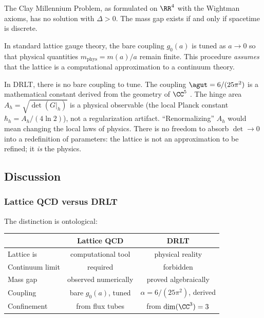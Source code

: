 \begin{corollary}
The Clay Millennium Problem, as formulated on $\RR^4$ with the
Wightman axioms, has no solution with $\Delta > 0$. The mass gap exists
if and only if spacetime is discrete.
\end{corollary}

\begin{remark}
In standard lattice gauge theory, the bare coupling $g_0(a)$ is tuned as
$a \to 0$ so that physical quantities $m_{\mathrm{phys}} = m(a)/a$
remain finite. This procedure \emph{assumes} that the lattice is a
computational approximation to a continuum theory.

In DRLT, there is no bare coupling to tune. The coupling
$\agut = 6/(25\pi^2)$ is a mathematical constant
derived from the geometry of $\CC^5$ . The hinge
area $A_h = \sqrt{\det(G|_h)}$ is a physical observable (the local
Planck constant $\hbar_h = A_h/(4\ln 2)$), not a regularization
artifact. ``Renormalizing'' $A_h$ would mean changing the local laws of
physics. There is no freedom to absorb $\det \to 0$ into a redefinition
of parameters: the lattice is not an approximation to be refined; it
\emph{is} the physics.
\end{remark}

\subsection{Discussion}
\label{sec:discussion}

\subsubsection{Lattice QCD versus DRLT}

The distinction is ontological:

\begin{center}
\begin{tabular}{lcc}
\hline
& Lattice QCD & DRLT \\
\hline
Lattice is & computational tool & physical reality \\
Continuum limit & required & forbidden \\
Mass gap & observed numerically & proved algebraically \\
Coupling & bare $g_0(a)$, tuned & $\alpha = 6/(25\pi^2)$, derived \\
Confinement & from flux tubes & from $\dim(\CC^3) = 3$ \\
\hline
\end{tabular}
\end{center}

